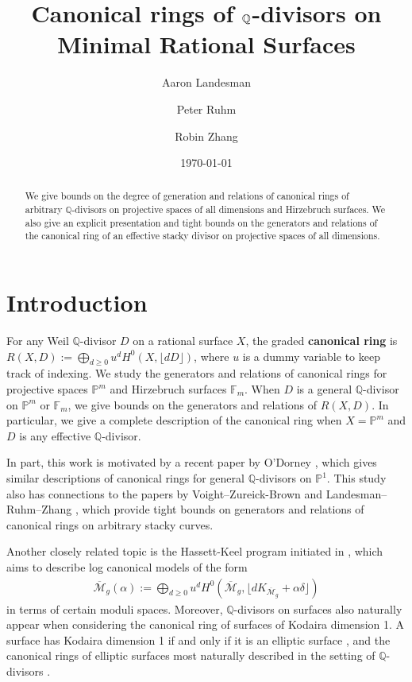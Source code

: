 \documentclass{amsart}
\title{Canonical rings of $\bq$-divisors on Minimal Rational Surfaces}
\author{Aaron Landesman}
\author{Peter Ruhm}
\author{Robin Zhang}
\date{\today}
\theoremstyle{plain}
\theoremstyle{definition}
\theoremstyle{remark}
\numberwithin{equation}{section}
\newcommand\bq{{\mathbb Q}}
\newcommand\bp{{\mathbb P}}
\newcommand\hirz{\mathbb{F}}
\begin{document}
\begin{abstract}
 	We give bounds on the degree of generation and relations of
	canonical rings of arbitrary $\bq$-divisors
	on projective spaces of all dimensions
	and Hirzebruch surfaces. We also give an explicit presentation 		and tight bounds on the
	generators and relations of the canonical ring of an effective
	stacky divisor on projective spaces of all dimensions.
\end{abstract}

\maketitle

\todo{Make sure to index starting from 0 in $\bp^m$ section}


\section{Introduction}
\label{sec:intro}
For any Weil $\bq$-divisor $D$ on a rational surface $X$, the graded
\textbf{canonical ring} is $R(X, D) := \bigoplus_{d \geq 0} u^d H^0(X, \lfloor dD \rfloor)$, where $u$ is a dummy variable to keep
track of indexing.
We study the generators and relations of canonical
rings for projective spaces $\bp^m$ and Hirzebruch surfaces $\hirz_m$.
When $D$ is a general $\bq$-divisor on $\bp^m$ or
$\hirz_m$, we give bounds on the generators and relations of
$R(X, D)$. In particular, we give a complete description of the
canonical ring when $X = \bp^m$ and $D$ is any effective
$\bq$-divisor.  

In part, this work is motivated by a recent paper by
O'Dorney \cite{dorney:canonical}, which gives similar descriptions
of canonical rings for general $\bq$-divisors on $\bp^1$. This
study also has connections to the papers by Voight--Zureick-Brown 
\cite{vzb:stacky} and Landesman--Ruhm--Zhang \cite{lrz:spin-cring},
which provide tight bounds on generators and relations
of canonical rings on arbitrary stacky curves.

Another closely related topic is the Hassett-Keel program 
initiated in \cite{hassett:classical-and-minimal-models}, which aims to describe log canonical models of the form
\begin{align*}
	\overline {\mathscr M}_g(\alpha) := \bigoplus_{d \geq 0} u^d H^0 \left(
	\overline {\mathscr M}_g, \lfloor d K_{\overline{\mathscr M}_g} +
	\alpha\delta \rfloor  \right) 
\end{align*}
in terms of certain moduli spaces. Moreover, $\bq$-divisors on surfaces also naturally
appear when considering the canonical ring of surfaces of Kodaira dimension 1.
A surface has Kodaira dimension 1 if and only if it is an elliptic surface \cite[p. 244]{
barthHPV:compactComplexSurfaces}, and
the canonical rings of elliptic surfaces most naturally described in the setting of
$\bq$-divisors \cite[Chapter V, Theorem 12.1]{barthHPV:compactComplexSurfaces}. 
\end{document}
